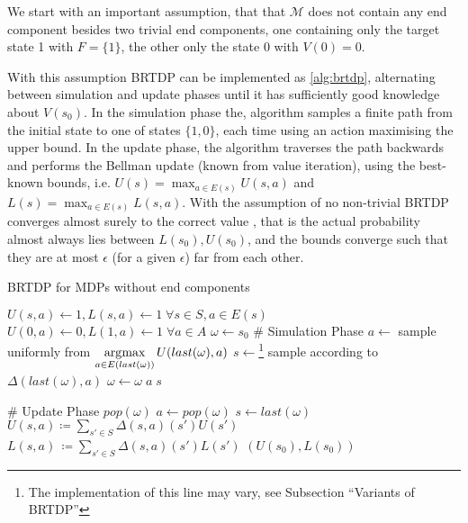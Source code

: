 We start with an important assumption, that
that $\mathcal{M}$ does not contain any end component
besides two trivial end components, one containing only the target state
1 with $F = \{1\}$, the other only the state 0 with $V(0) = 0$.

With this assumption BRTDP can be implemented as \autoref{alg:brtdp},
alternating between simulation and update phases until it has
sufficiently good knowledge about $V(s_0)$. In the simulation phase the,
algorithm samples a finite path from the initial state to one of states
$\{1, 0\}$, each time using an action maximising the upper bound.
In the update phase, the algorithm traverses the path backwards and
performs the Bellman update (known from value iteration),
using the best-known bounds, i.e.
$U(s) = \max_{a \in E(s)} U(s, a)$
and
$L(s) = \max_{a \in E(s)} L(s, a)$.
With the assumption of no non-trivial BRTDP converges almost surely to the correct value \parencite{atva14},
that is
the actual probability almost always lies between $L(s_0), U(s_0)$,
and the bounds converge such that they are at most $\epsilon$ (for a
given $\epsilon$) far from each other.


\begin{algorithm}
\caption{BRTDP for MDPs without end components}
\label{alg:brtdp}
\begin{algorithmic}
\State $U(s,a) \gets 1, L(s,a) \gets 1 \; \forall s \in S, a \in E(s)$
\State $U(0,a) \gets 0, L(1,a) \gets 1 \; \forall a \in A$
\State $\omega \gets s_0$
    \State \# Simulation Phase
        \State $a \gets$ sample uniformly from
           $\operatorname*{\arg\!\max}\limits_{a \in E(last(\omega))}
            U(last(\omega), a)$
        \State $s \gets$\footnote{The implementation of this line may
            vary, see Subsection ``Variants of BRTDP''}
            sample according to $\Delta(last(\omega), a)$
        \State $\omega \gets \omega \; a \; s$
    \EndWhile

    \State \# Update Phase
        \State $pop(\omega)$
        \State $a \gets pop(\omega)$
        \State $s \gets last(\omega)$
        \State $U(s,a) \coloneqq \sum_{s' \in S} \Delta(s,a)(s') U(s')$
        \State $L(s,a)\, \coloneqq \sum_{s' \in S} \Delta(s,a)(s') L(s')$
    \EndWhile
\EndWhile
\State \Return $(U(s_0), L(s_0))$
\end{algorithmic}
\end{algorithm}

